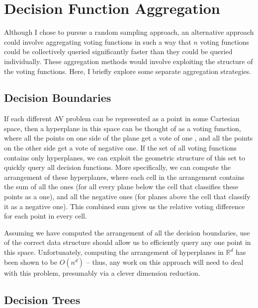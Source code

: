 \section{Decision Function Aggregation}
Although I chose to pursue a random sampling approach, an alternative approach could involve aggregating voting functions in such a way that $n$ voting functions could be collectively queried significantly faster than they could be queried individually. These aggregation methods would involve exploiting the structure of the voting functions. Here, I briefly explore some separate aggregation strategies.
\subsection{Decision Boundaries}
If each different AV problem can be represented as a point in some Cartesian space, then a hyperplane in this space can be thought of as a voting function, where all the points on one side of the plane get a vote of one , and all the points on the other side get a vote of negative one. If the set of all voting functions contains only hyperplanes, we can exploit the geometric structure of this set to quickly query all decision functions. More specifically, we can compute the arrangement of these hyperplanes, where each cell in the arrangement contains the sum of all the ones (for all every plane below the cell that classifies these points as a one), and all the negative ones (for planes above the cell that classify it as a negative one). This combined sum gives us the relative voting difference for each point in every cell.

Assuming we have computed the arrangement of all the decision boundaries, use of the correct data structure should allow us to efficiently query any one point in this space. Unfortunately, computing the arrangement of hyperplanes in $\mathbb{R}^d$ has been shown to be $O(n^d)$ -- thus, any work on this approach will need to deal with this problem, presumably via a clever dimension reduction.
\subsection{Decision Trees}